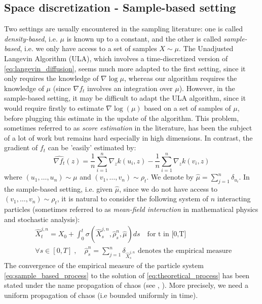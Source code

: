 

\subsection{Space discretization - Sample-based setting}

Two settings are usually encountered in the sampling literature: one is called \textit{density-based}, i.e. $\mu$ is known up to a constant, and the other is called \textit{sample-based}, i.e. we only have access to a set of samples $X \sim \mu$.
The Unadjusted Langevin Algorithm (ULA), which involves a time-discretized version of \eqref{eq:langevin_diffusion}, seems much more adapted to the first setting, since it only requires the knowledge of $\nabla \log \mu$, whereas our algorithm requires the knowledge of $\mu$ (since $\nabla f_t$ involves an integration over $\mu$). However, in the sample-based setting, it may be difficult to adapt the ULA algorithm, since it would require firstly to estimate $\nabla \log(\mu)$ based on a set of samples of $\mu$, before plugging this estimate in the update of the algorithm. This problem, sometimes referred to as \textit{score estimation} in the literature, has been the subject of a lot of work but remains hard especially in high dimensions. In contrast, the gradient of $f_t$ can be 'easily' estimated by:
\begin{equation}
\widehat{\nabla f_t}(z)= \frac{1}{n}\sum_{i=1}^{n}\nabla_{z}k(u_i,z) -\frac{1}{n}\sum_{i=1}^{n}\nabla_{z}k(v_i,z) 
\end{equation}
where $(u_1, \dots, u_n)\sim \mu$ and $(v_1, \dots, v_n)\sim \rho_t$. We denote by $\widehat{ \mu}=\sum_{j=1}^{n}\delta_{u_i}$. In the sample-based setting, i.e. given $\widehat{\mu}$, since we do not have access to $(v_1, \dots, v_n)\sim \rho_t$, it is natural to consider the following system of $n$ interacting particles (sometimes referred to as \textit{mean-field interaction} in mathematical physics and stochastic analysis):
\begin{align}\label{eq:sample_based_process}
&\widehat{X}_t^{j,n}=X_{0}+\int_{0}^t \sigma(\widehat{X}_s^{j,n}, \widehat{\rho}_s^n, \widehat{\mu})ds \quad \text{for t in [0,T]}\\
&\forall s \in [0,T]\;,\quad \widehat{\rho}_s^n=\sum_{j=1}^{n} \delta_{\widehat{X}_s^{j,n}} \text{ denotes the empirical measure } 
\end{align}
The convergence of the empirical measure of the particle system \eqref{eq:sample_based_process} to the solution of \eqref{eq:theoretical_process} has been stated under the name propagation of chaos (see \cite{kac1956foundations}, \cite{sznitman1991topics}).
More precisely, we need a uniform propagation of chaos (i.e bounded uniformly in time).


